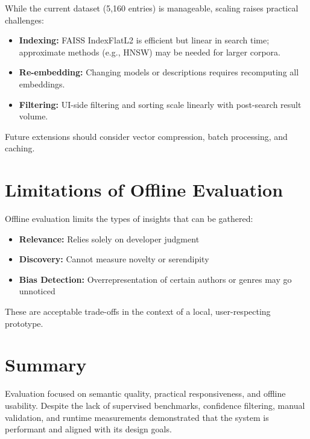 While the current dataset (5,160 entries) is manageable, scaling raises practical challenges:

\begin{itemize}
    \item \textbf{Indexing:} FAISS IndexFlatL2 is efficient but linear in search time; approximate methods (e.g., HNSW) may be needed for larger corpora.
    \item \textbf{Re-embedding:} Changing models or descriptions requires recomputing all embeddings.
    \item \textbf{Filtering:} UI-side filtering and sorting scale linearly with post-search result volume.
\end{itemize}

Future extensions should consider vector compression, batch processing, and caching.

\section{Limitations of Offline Evaluation}
\label{sec:limitations}

Offline evaluation limits the types of insights that can be gathered:

\begin{itemize}
    \item \textbf{Relevance:} Relies solely on developer judgment
    \item \textbf{Discovery:} Cannot measure novelty or serendipity
    \item \textbf{Bias Detection:} Overrepresentation of certain authors or genres may go unnoticed
\end{itemize}

These are acceptable trade-offs in the context of a local, user-respecting prototype.

\section{Summary}
\label{sec:performance-summary}

Evaluation focused on semantic quality, practical responsiveness, and offline usability. Despite the lack of supervised benchmarks, confidence filtering, manual validation, and runtime measurements demonstrated that the system is performant and aligned with its design goals.
